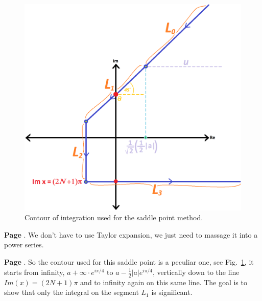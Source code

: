 \documentclass[aps,preprint,preprintnumbers,nofootinbib,showpacs,prd]{revtex4-1}
\begin{document}
%
\begin{figure}
\centering
  \includegraphics[width=1.00\linewidth]{Saddle_Point_Contour.png}
  \caption{Contour of integration used for the saddle point method.}
\label{fig:Saddle_Point_Contour}
\end{figure}
%





{\bf Page }. We don't have to use Taylor expansion, we just need to massage it into a power series.













{\bf Page }. So the contour used for this saddle point is a peculiar one, see Fig.~\ref{fig:Saddle_Point_Contour}, it starts from infinity, $a + \infty\cdot e^{i\pi/4}$ to $a - \frac{1}{2}|a|e^{i\pi/4}$, vertically down to the line $Im(x) = (2N+1)\pi$ and to infinity again on this same line. The goal is to show that only the integral on the segment $L_1$ is significant.
\end{document}
